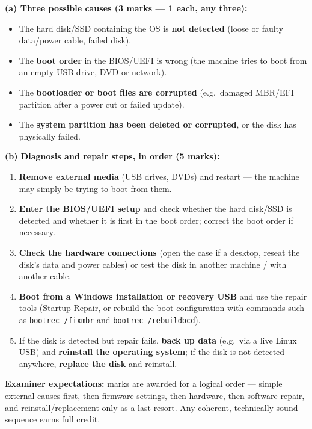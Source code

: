 \documentclass[11pt]{article}
\begin{document}
\begin{corrige}
\textbf{(a) Three possible causes (3 marks — 1 each, any three):}
\begin{itemize}
\item The hard disk/SSD containing the OS is \textbf{not detected} (loose or faulty data/power cable, failed disk).
\item The \textbf{boot order} in the BIOS/UEFI is wrong (the machine tries to boot from an empty USB drive, DVD or network).
\item The \textbf{bootloader or boot files are corrupted} (e.g.\ damaged MBR/EFI partition after a power cut or failed update).
\item The \textbf{system partition has been deleted or corrupted}, or the disk has physically failed.
\end{itemize}

\textbf{(b) Diagnosis and repair steps, in order (5 marks):}
\begin{enumerate}
\item \textbf{Remove external media} (USB drives, DVDs) and restart — the machine may simply be trying to boot from them.
\item \textbf{Enter the BIOS/UEFI setup} and check whether the hard disk/SSD is detected and whether it is first in the boot order; correct the boot order if necessary.
\item \textbf{Check the hardware connections} (open the case if a desktop, reseat the disk's data and power cables) or test the disk in another machine / with another cable.
\item \textbf{Boot from a Windows installation or recovery USB} and use the repair tools (Startup Repair, or rebuild the boot configuration with commands such as \texttt{bootrec /fixmbr} and \texttt{bootrec /rebuildbcd}).
\item If the disk is detected but repair fails, \textbf{back up data} (e.g.\ via a live Linux USB) and \textbf{reinstall the operating system}; if the disk is not detected anywhere, \textbf{replace the disk} and reinstall.
\end{enumerate}
\textbf{Examiner expectations:} marks are awarded for a logical order — simple external causes first, then firmware settings, then hardware, then software repair, and reinstall/replacement only as a last resort. Any coherent, technically sound sequence earns full credit.
\end{corrige}
\end{document}
